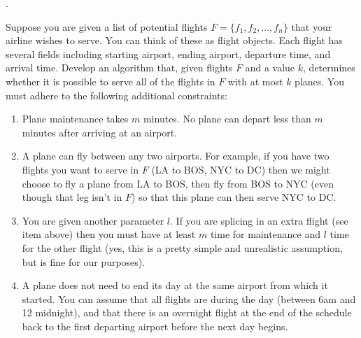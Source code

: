 \documentclass[12pt]{article}
\newcounter{quesnum}
\newcommand{\question}[2][??]{
\begin{list}{\labelitemi}{\leftmargin=2em}
\item [\arabic{quesnum}.] {#2}
\end{list}
\addtocounter{quesnum}{1}
}
\begin{document}
\question[3]{
Suppose you are given a list of potential flights $F=\{f_1,f_2,...,f_n\}$ that your airline wishes to serve. You can think of these as flight objects. Each flight has several fields including starting airport, ending airport, departure time, and arrival time. Develop an algorithm that, given flights $F$ and a value $k$, determines whether it is possible to serve all of the flights in $F$ with at most $k$ planes. You must adhere to the following additional constraints:

\begin{enumerate}
\item Plane maintenance takes $m$ minutes. No plane can depart less than $m$ minutes after arriving at an airport.
\item A plane can fly between any two airports. For example, if you have two flights you want to serve in $F$ (LA to BOS, NYC to DC) then we might choose to fly a plane from LA to BOS, then fly from BOS to NYC (even though that leg isn't in $F$) so that this plane can then serve NYC to DC.
\item  You are given another parameter $l$. If you are splicing in an extra flight (see item above) then you must have at least $m$ time for maintenance and $l$ time for the other flight (yes, this is a pretty simple and unrealistic assumption, but is fine for our purposes).
\item A plane does not need to end its day at the same airport from which it started. You can assume that all flights are during the day (between 6am and 12 midnight), and that there is an overnight flight at the end of the schedule back to the first departing airport before the next day begins.
\end{enumerate}

}
\end{document}

